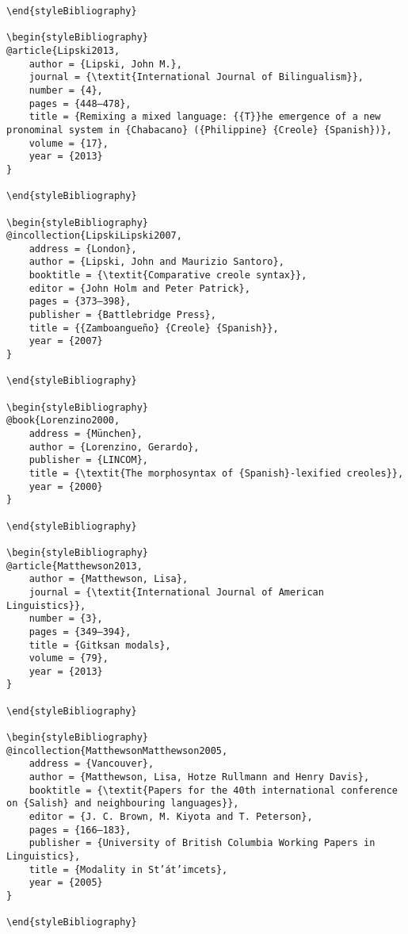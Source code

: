 \documentclass[output=paper]{langsci/langscibook}
\begin{document}
\begin{stylelsUnNumberedSection}
\begin{verbatim}
\end{styleBibliography}

\begin{styleBibliography}
@article{Lipski2013,
	author = {Lipski, John M.},
	journal = {\textit{International Journal of Bilingualism}},
	number = {4},
	pages = {448–478},
	title = {Remixing a mixed language: {{T}}he emergence of a new pronominal system in {Chabacano} ({Philippine} {Creole} {Spanish})},
	volume = {17},
	year = {2013}
}

\end{styleBibliography}

\begin{styleBibliography}
@incollection{LipskiLipski2007,
	address = {London},
	author = {Lipski, John and Maurizio Santoro},
	booktitle = {\textit{Comparative creole syntax}},
	editor = {John Holm and Peter Patrick},
	pages = {373–398},
	publisher = {Battlebridge Press},
	title = {{Zamboangueño} {Creole} {Spanish}},
	year = {2007}
}

\end{styleBibliography}

\begin{styleBibliography}
@book{Lorenzino2000,
	address = {München},
	author = {Lorenzino, Gerardo},
	publisher = {LINCOM},
	title = {\textit{The morphosyntax of {Spanish}-lexified creoles}},
	year = {2000}
}

\end{styleBibliography}

\begin{styleBibliography}
@article{Matthewson2013,
	author = {Matthewson, Lisa},
	journal = {\textit{International Journal of American Linguistics}},
	number = {3},
	pages = {349–394},
	title = {Gitksan modals},
	volume = {79},
	year = {2013}
}

\end{styleBibliography}

\begin{styleBibliography}
@incollection{MatthewsonMatthewson2005,
	address = {Vancouver},
	author = {Matthewson, Lisa, Hotze Rullmann and Henry Davis},
	booktitle = {\textit{Papers for the 40th international conference on {Salish} and neighbouring languages}},
	editor = {J. C. Brown, M. Kiyota and T. Peterson},
	pages = {166–183},
	publisher = {University of British Columbia Working Papers in Linguistics},
	title = {Modality in St’át’imcets},
	year = {2005}
}

\end{styleBibliography}


\end{verbatim}
\end{stylelsUnNumberedSection}
\end{document}
